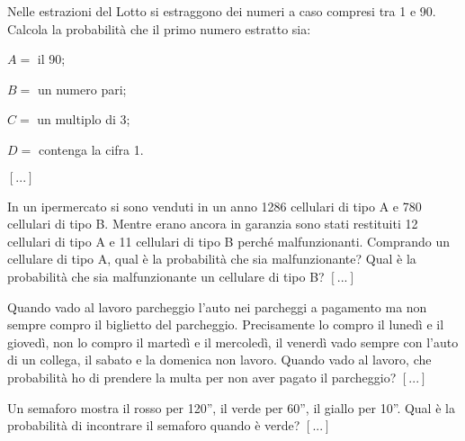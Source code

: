 \begin{esercizio}
 \label{ese:9.24}
Nelle estrazioni del Lotto si estraggono dei numeri a caso compresi tra 1 e 90. 
Calcola la probabilità che il primo numero estratto sia:
\begin{itemize*}
\item $ A= $ il 90;
\item $ B= $ un numero pari;
\item $ C= $ un multiplo di 3;
\item $ D= $ contenga la cifra 1.
\end{itemize*}
\hfill $\left[...\right]$
\end{esercizio}

\begin{esercizio}
 \label{ese:9.25}
In un ipermercato si sono venduti in un anno 1286 cellulari di tipo A e 780 
cellulari di tipo B. Mentre erano ancora in garanzia sono stati restituiti 12 
cellulari di tipo A e 11 cellulari di tipo B perché malfunzionanti. Comprando un 
cellulare di tipo A, qual è la probabilità che sia malfunzionante? Qual è la 
probabilità che sia malfunzionante un cellulare di tipo B?
\hfill $\left[...\right]$
\end{esercizio}

\begin{esercizio}
 \label{ese:9.26}
Quando vado al lavoro parcheggio l'auto nei parcheggi a pagamento ma non sempre 
compro il biglietto del parcheggio. Precisamente lo compro il lunedì e il 
giovedì, non lo compro il martedì e il mercoledì, il venerdì vado sempre con 
l'auto di un collega, il sabato e la domenica non lavoro. Quando vado al lavoro, 
che probabilità ho di prendere la multa per non aver pagato il parcheggio?
\hfill $\left[...\right]$
\end{esercizio}

\begin{esercizio}
 \label{ese:9.27}
Un semaforo mostra il rosso per 120'', il verde per 60'', il giallo per 10''. 
Qual è la probabilità di incontrare il semaforo quando è verde?
\hfill $\left[...\right]$
\end{esercizio}


